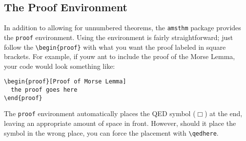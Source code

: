 \subsection{The Proof Environment}
\label{sec:proof-environment}

In addition to allowing for unnumbered theorems, the \texttt{amsthm}
package provides the \texttt{proof} environment.  Using the
environment is fairly straightforward; just follow the
\verb|\begin{proof}| with what you want the proof labeled in square
  brackets.  For example, if youw ant to include the proof of the
  Morse Lemma, your code would look something like:
\begin{verbatim}
\begin{proof}[Proof of Morse Lemma]
  the proof goes here
\end{proof}
\end{verbatim}
The \texttt{proof} environment automatically places the QED symbol
($\Box$) at the end, leaving an appropriate amount of space in
front.  However, should it place the symbol in the wrong place, you
can force the placement with \verb|\qedhere|.

